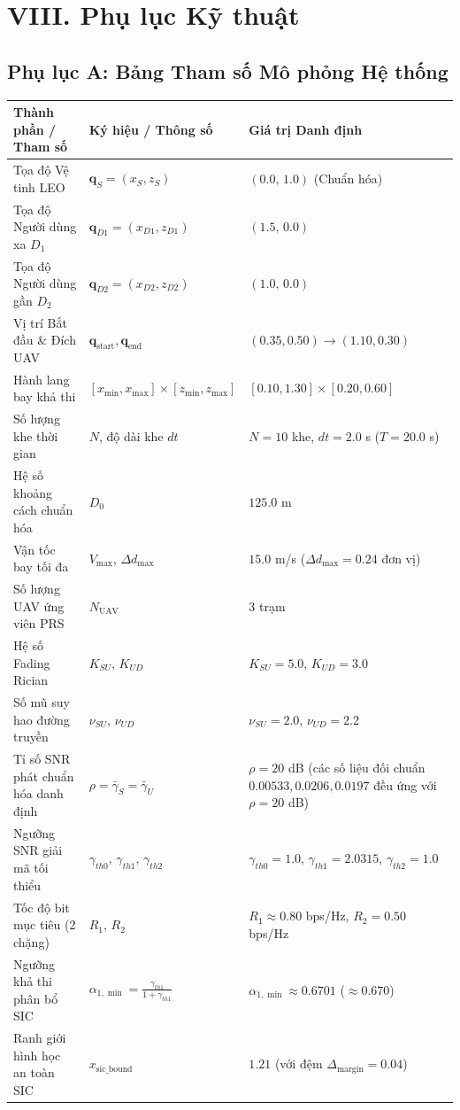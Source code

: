 \section*{VIII. Phụ lục Kỹ thuật}

\subsection*{Phụ lục A: Bảng Tham số Mô phỏng Hệ thống}
\vspace{0.2cm}
\begin{center}
\renewcommand{\arraystretch}{1.2}
\begin{tabularx}{\textwidth}{|p{4.8cm}|p{4.0cm}|X|}
\hline
\rowcolor{tableheader}
\textbf{Thành phần / Tham số} & \textbf{Ký hiệu / Thông số} & \textbf{Giá trị Danh định} \\
\hline
Tọa độ Vệ tinh LEO & $\mathbf{q}_S = (x_S, z_S)$ & $(0.0, \, 1.0)$ (Chuẩn hóa) \\
Tọa độ Người dùng xa $D_1$ & $\mathbf{q}_{D1} = (x_{D1}, z_{D1})$ & $(1.5, \, 0.0)$ \\
Tọa độ Người dùng gần $D_2$ & $\mathbf{q}_{D2} = (x_{D2}, z_{D2})$ & $(1.0, \, 0.0)$ \\
Vị trí Bắt đầu \& Đích UAV & $\mathbf{q}_{\text{start}}, \mathbf{q}_{\text{end}}$ & $(0.35, 0.50) \to (1.10, 0.30)$ \\
Hành lang bay khả thi & $[x_{\min}, x_{\max}] \times [z_{\min}, z_{\max}]$ & $[0.10, 1.30] \times [0.20, 0.60]$ \\
Số lượng khe thời gian & $N$, độ dài khe $dt$ & $N = 10$ khe, $dt = 2.0$ s ($T = 20.0$ s) \\
Hệ số khoảng cách chuẩn hóa & $D_0$ & $125.0$ m \\
Vận tốc bay tối đa & $V_{\max}$, $\Delta d_{\max}$ & $15.0$ m/s ($\Delta d_{\max} = 0.24$ đơn vị) \\
Số lượng UAV ứng viên PRS & $N_{\text{UAV}}$ & $3$ trạm \\
Hệ số Fading Rician & $K_{SU}, \, K_{UD}$ & $K_{SU} = 5.0$, $K_{UD} = 3.0$ \\
Số mũ suy hao đường truyền & $\nu_{SU}, \, \nu_{UD}$ & $\nu_{SU} = 2.0$, $\nu_{UD} = 2.2$ \\
Tỉ số SNR phát chuẩn hóa danh định & $\rho = \bar{\gamma}_S = \bar{\gamma}_U$ & $\rho = 20$ dB (các số liệu đối chuẩn $0.00533, 0.0206, 0.0197$ đều ứng với $\rho = 20$ dB) \\
Ngưỡng SNR giải mã tối thiểu & $\gamma_{th0}, \, \gamma_{th1}, \, \gamma_{th2}$ & $\gamma_{th0} = 1.0$, $\gamma_{th1} = 2.0315$, $\gamma_{th2} = 1.0$ \\
Tốc độ bit mục tiêu (2 chặng) & $R_1, \, R_2$ & $R_1 \approx 0.80$ bps/Hz, $R_2 = 0.50$ bps/Hz \\
Ngưỡng khả thi phân bổ SIC & $\alpha_{1,\min} = \frac{\gamma_{th1}}{1 + \gamma_{th1}}$ & $\alpha_{1,\min} \approx 0.6701$ ($\approx 0.670$) \\
Ranh giới hình học an toàn SIC & $x_{\text{sic\_bound}}$ & $1.21$ (với đệm $\Delta_{\text{margin}} = 0.04$) \\
\hline
\end{tabularx}
\end{center}
\vspace{0.3cm}


